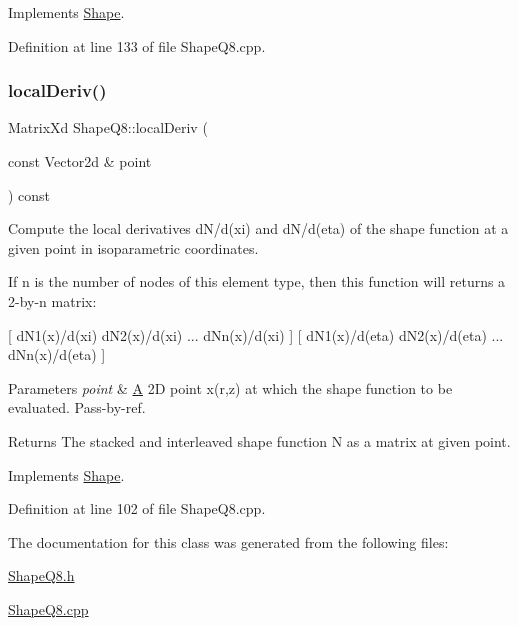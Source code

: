 Implements \mbox{\hyperlink{class_shape_a4257697bb443af2871a7cc7a82c8c823}{Shape}}.



Definition at line 133 of file Shape\+Q8.\+cpp.

\mbox{\label{class_shape_q8_ac62182e6804216500c2b290efd5fd06a}} 
\subsubsection{\texorpdfstring{local\+Deriv()}{localDeriv()}}
{\footnotesize\ttfamily Matrix\+Xd Shape\+Q8\+::local\+Deriv (\begin{DoxyParamCaption}\item[{const Vector2d \&}]{point }\end{DoxyParamCaption}) const\hspace{0.3cm}{\ttfamily [virtual]}}



Compute the local derivatives d\+N/d(xi) and d\+N/d(eta) of the shape function at a given point in isoparametric coordinates. 

If n is the number of nodes of this element type, then this function will returns a 2-\/by-\/n matrix\+:

\mbox{[} d\+N1(x)/d(xi) d\+N2(x)/d(xi) ... d\+Nn(x)/d(xi) \mbox{]} \mbox{[} d\+N1(x)/d(eta) d\+N2(x)/d(eta) ... d\+Nn(x)/d(eta) \mbox{]}


\begin{DoxyParams}{Parameters}
{\em point} & \mbox{\hyperlink{class_a}{A}} 2D point x(r,z) at which the shape function to be evaluated. Pass-\/by-\/ref. \\
\hline
\end{DoxyParams}
\begin{DoxyReturn}{Returns}
The stacked and interleaved shape function N as a matrix at given point. 
\end{DoxyReturn}


Implements \mbox{\hyperlink{class_shape_a55575394f656e3ee4b5ac37ea04af8c9}{Shape}}.



Definition at line 102 of file Shape\+Q8.\+cpp.



The documentation for this class was generated from the following files\+:\begin{DoxyCompactItemize}
\item 
\mbox{\hyperlink{_shape_q8_8h}{Shape\+Q8.\+h}}\item 
\mbox{\hyperlink{_shape_q8_8cpp}{Shape\+Q8.\+cpp}}\end{DoxyCompactItemize}
